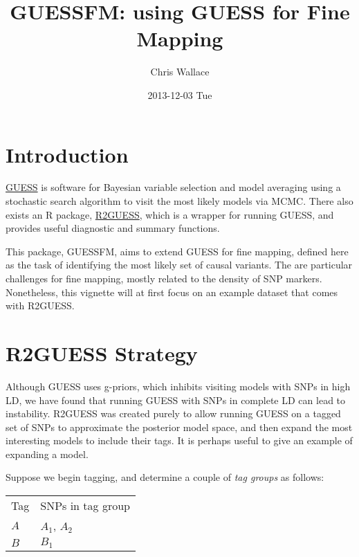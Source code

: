 \documentclass[11pt]{article}
\author{Chris Wallace}
\date{2013-12-03 Tue}
\title{GUESSFM: using GUESS for Fine Mapping}
\begin{document}
\maketitle
\tableofcontents


\section{Introduction}
\label{sec-1}

\href{http://www.bgx.org.uk/software/guess.html}{GUESS} is software for Bayesian variable selection and model averaging
using a stochastic search algorithm to visit the most likely models
via MCMC.  There also exists an R package, \href{http://cran.r-project.org/web/packages/R2GUESS/index.html}{R2GUESS}, which is a wrapper
for running GUESS, and provides useful diagnostic and summary
functions.

This package, GUESSFM, aims to extend GUESS for fine mapping, defined
here as the task of identifying the most likely set of causal
variants.  The are particular challenges for fine mapping, mostly
related to the density of SNP markers.  Nonetheless, this vignette
will at first focus on an example dataset that comes with R2GUESS.

\section{R2GUESS Strategy}
\label{sec-2}

Although GUESS uses g-priors, which inhibits visiting models with SNPs
in high LD, we have found that running GUESS with SNPs in complete LD
can lead to instability.  R2GUESS was created purely to allow running
GUESS on a tagged set of SNPs to approximate the posterior model
space, and then expand the most interesting models to include their tags.  It is perhaps useful to give an example of expanding a model.

Suppose we begin tagging, and determine a couple of \emph{tag groups} as follows:

\begin{center}
\begin{tabular}{ll}
Tag & SNPs in tag group\\
$A$ & $A_1$, $A_2$\\
$B$ & $B_1$\\
\end{tabular}
\end{center}
\end{document}
